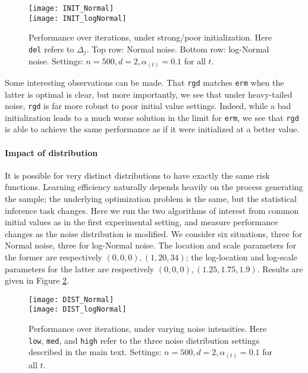 \documentclass[11pt,oneside]{article}
\theoremstyle{definition} \newtheorem{defn}{Definition}       %
\theoremstyle{plain} \newtheorem{prop}[defn]{Proposition}           %
\theoremstyle{plain} \newtheorem{thm}[defn]{Theorem}                %
\theoremstyle{plain} \newtheorem{lem}[defn]{Lemma}                  %
\theoremstyle{plain} \newtheorem{cor}[defn]{Corollary}              %
\theoremstyle{remark} \newtheorem{rmk}[defn]{Remark}                %
\theoremstyle{remark} \newtheorem{ex}[defn]{Example}                %
\begin{document}
\begin{figure}[t]
\centering
\texttt{[image: INIT\_Normal]}\\
\texttt{[image: INIT\_logNormal]}
\caption{Performance over iterations, under strong/poor initialization. Here \texttt{del} refers to $\Delta_{j}$. Top row: Normal noise. Bottom row: log-Normal noise. Settings: $n = 500, d=2, \alpha_{(t)}=0.1$ for all $t$.}
\label{fig:INIT}
\end{figure}

Some interesting observations can be made. That \texttt{rgd} matches \texttt{erm} when the latter is optimal is clear, but more importantly, we see that under heavy-tailed noise, \texttt{rgd} is far more robust to poor initial value settings. Indeed, while a bad initialization leads to a much worse solution in the limit for \texttt{erm}, we see that \texttt{rgd} is able to achieve the same performance as if it were initialized at a better value.


\paragraph{Impact of distribution}

It is possible for very distinct distributions to have exactly the same risk functions. Learning efficiency naturally depends heavily on the process generating the sample; the underlying optimization problem is the same, but the statistical inference task changes. Here we run the two algorithms of interest from common initial values as in the first experimental setting, and measure performance changes as the noise distribution is modified. We consider six situations, three for Normal noise, three for log-Normal noise. The location and scale parameters for the former are respectively $(0,0,0), (1,20,34)$; the log-location and log-scale parameters for the latter are respectively $(0,0,0), (1.25,1.75,1.9)$. Results are given in Figure \ref{fig:DIST}.

\begin{figure}[t]
\centering
\texttt{[image: DIST\_Normal]}\\
\texttt{[image: DIST\_logNormal]}
\caption{Performance over iterations, under varying noise intensities. Here \texttt{low}, \texttt{med}, and \texttt{high} refer to the three noise distribution settings described in the main text. Settings: $n = 500, d = 2, \alpha_{(t)}=0.1$ for all $t$.}
\label{fig:DIST}
\end{figure}
\end{document}
